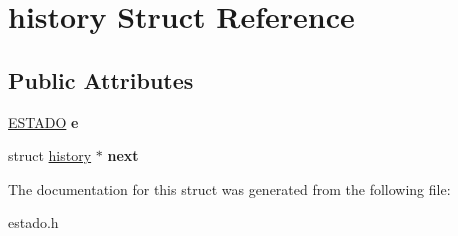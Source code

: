 \hypertarget{structhistory}{}\section{history Struct Reference}
\label{structhistory}
\subsection*{Public Attributes}
\begin{DoxyCompactItemize}
\item 
\mbox{\label{structhistory_a3679e381dd3c401fc3f5a7590e399706}} 
\mbox{\hyperlink{structestado}{E\+S\+T\+A\+DO}} {\bfseries e}
\item 
\mbox{\label{structhistory_a8b33a8ab11ad4a8a569db7ad6b65396a}} 
struct \mbox{\hyperlink{structhistory}{history}} $\ast$ {\bfseries next}
\end{DoxyCompactItemize}


The documentation for this struct was generated from the following file\+:\begin{DoxyCompactItemize}
\item 
estado.\+h\end{DoxyCompactItemize}
